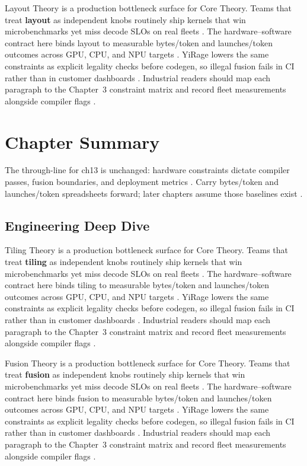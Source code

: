 Layout Theory is a production bottleneck surface for Core Theory. Teams that treat \textbf{layout} as independent knobs routinely ship kernels that win microbenchmarks yet miss decode SLOs on real fleets \citep{semianalysis2024tma,dlbook}. The hardware--software contract here binds layout to measurable bytes/token and launches/token outcomes across GPU, CPU, and NPU targets \citep{amd2024xdna,dao2022flashattention}. YiRage lowers the same constraints as explicit legality checks before codegen, so illegal fusion fails in CI rather than in customer dashboards \citep{amd2024aie,kwon2023vllm}. Industrial readers should map each paragraph to the Chapter~3 constraint matrix and record fleet measurements alongside compiler flags \citep{dlbook,nvidia2024cudagraphs}.

\section{Chapter Summary}
\label{sec:ch13_summary}

The through-line for ch13 is unchanged: hardware constraints dictate compiler passes, fusion boundaries, and deployment metrics \citep{memoryfloor2026,amd2024xdna}. Carry bytes/token and launches/token spreadsheets forward; later chapters assume those baselines exist \citep{semianalysis2024tma,dlbook}.


\subsection{Engineering Deep Dive}
\label{sec:ch13_deep_dive}

Tiling Theory is a production bottleneck surface for Core Theory. Teams that treat \textbf{tiling} as independent knobs routinely ship kernels that win microbenchmarks yet miss decode SLOs on real fleets \citep{semianalysis2024tma,dlbook}. The hardware--software contract here binds tiling to measurable bytes/token and launches/token outcomes across GPU, CPU, and NPU targets \citep{amd2024xdna,dao2022flashattention}. YiRage lowers the same constraints as explicit legality checks before codegen, so illegal fusion fails in CI rather than in customer dashboards \citep{amd2024aie,kwon2023vllm}. Industrial readers should map each paragraph to the Chapter~3 constraint matrix and record fleet measurements alongside compiler flags \citep{dlbook,nvidia2024cudagraphs}.

Fusion Theory is a production bottleneck surface for Core Theory. Teams that treat \textbf{fusion} as independent knobs routinely ship kernels that win microbenchmarks yet miss decode SLOs on real fleets \citep{amd2024xdna,dao2022flashattention}. The hardware--software contract here binds fusion to measurable bytes/token and launches/token outcomes across GPU, CPU, and NPU targets \citep{amd2024aie,kwon2023vllm}. YiRage lowers the same constraints as explicit legality checks before codegen, so illegal fusion fails in CI rather than in customer dashboards \citep{dlbook,nvidia2024cudagraphs}. Industrial readers should map each paragraph to the Chapter~3 constraint matrix and record fleet measurements alongside compiler flags \citep{dao2022flashattention,liu2024deepseekv3}.


